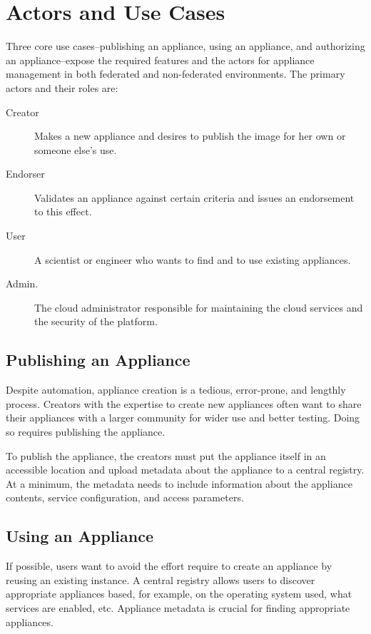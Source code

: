 \section{Actors and Use Cases}
\label{sec:use-cases}

Three core use cases--publishing an appliance, using an appliance, and
authorizing an appliance--expose the required features and the actors
for appliance management in both federated and non-federated
environments.  The primary actors and their roles are:
\begin{description}
\item[Creator] Makes a new appliance and desires to publish the image
  for her own or someone else's use.
\item[Endorser] Validates an appliance against certain criteria and
  issues an endorsement to this effect.
\item[User] A scientist or engineer who wants to find and to use
  existing appliances.
\item[Admin.] The cloud administrator responsible for
  maintaining the cloud services and the security of the platform.
\end{description}

\subsection{Publishing an Appliance}

Despite automation, appliance creation is a tedious, error-prone, and
lengthly process.  Creators with the expertise to create new
appliances often want to share their appliances with a larger
community for wider use and better testing.  Doing so requires
publishing the appliance.

To publish the appliance, the creators must put the appliance itself
in an accessible location and upload metadata about the appliance to a
central registry.  At a minimum, the metadata needs to include
information about the appliance contents, service configuration, and
access parameters.

\subsection{Using an Appliance}

If possible, users want to avoid the effort require to create an
appliance by reusing an existing instance.  A central registry allows
users to discover appropriate appliances based, for example, on the
operating system used, what services are enabled, etc.  Appliance
metadata is crucial for finding appropriate appliances.

